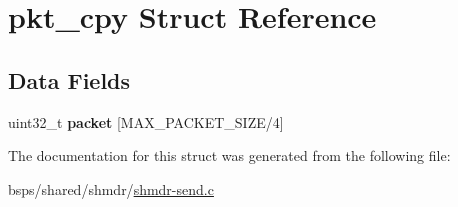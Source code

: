 \hypertarget{structpkt__cpy}{}\section{pkt\+\_\+cpy Struct Reference}
\label{structpkt__cpy}
\subsection*{Data Fields}
\begin{DoxyCompactItemize}
\item 
\mbox{\label{structpkt__cpy_a29867b2163eba524d96eb4aea77a5262}} 
uint32\+\_\+t {\bfseries packet} \mbox{[}M\+A\+X\+\_\+\+P\+A\+C\+K\+E\+T\+\_\+\+S\+I\+ZE/4\mbox{]}
\end{DoxyCompactItemize}


The documentation for this struct was generated from the following file\+:\begin{DoxyCompactItemize}
\item 
bsps/shared/shmdr/\mbox{\hyperlink{shmdr-send_8c}{shmdr-\/send.\+c}}\end{DoxyCompactItemize}
